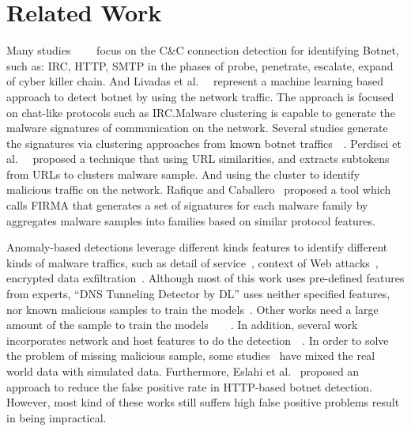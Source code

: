 \section{Related Work}

Many studies~\cite{feily2009survey}~\cite{barford2007inside}~\cite{strayer2008botnet}~\cite{atluri2017botnets} focus on the C\&C connection detection for identifying Botnet, such as: IRC, HTTP, SMTP in the phases of probe, penetrate, escalate, expand of cyber killer chain. And Livadas et al.~\cite{carl2006using}~\cite{strayer2006detecting} represent a machine learning based approach to detect botnet by using the network traffic. The approach is focused on chat-like protocols such as IRC.Malware clustering is capable to generate the malware signatures of communication on the network. Several studies generate the signatures via clustering approaches from known botnet traffics~\cite{p:zarras14}~\cite{nelms2013execscent}. Perdisci et al.~\cite{perdisci2013scalable}~\cite{perdisci2010behavioral} proposed a technique that using URL similarities, and extracts subtokens from URLs to clusters malware sample. And using the cluster to identify malicious traffic on the network. Rafique and Caballero~\cite{rafique2013firma} proposed a tool which calls FIRMA that generates a set of signatures for each malware family by aggregates malware samples into families based on similar protocol features.  

Anomaly-based detections leverage different kinds features to identify different kinds of malware traffics, such as detail of service~\cite{p:feinstein03}, context of Web attacks~\cite{p:krugel03}, encrypted data exfiltration~\cite{p:he14}.  Although most of this work uses pre-defined features from experts,  “DNS Tunneling Detector by DL” uses neither specified features, nor  known malicious samples to train the models~\cite{j:zhang16}. Other works need a large amount of the sample to train the models~\cite{bilge2012disclosure}~\cite{gu2008botminer}~\cite{binkley2006algorithm}~\cite{karasaridis2007wide}.  In addition, several work incorporates network and host features to do the detection~\cite{p:schwenk11}~\cite{borders2004web}.  In order to solve the problem of missing malicious sample, some studies~\cite{wang2018botcapturer} have mixed the real world data with simulated data. Furthermore, Eslahi et al.~\cite{eslahi2013efficient} proposed an approach to reduce the false positive rate in HTTP-based botnet detection. However, most kind of these works still suffers high false positive problems result in being impractical.

